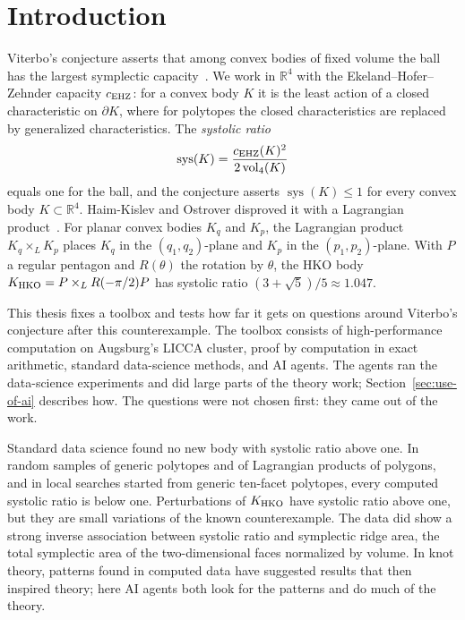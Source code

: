 \section{Introduction}\label{sec:introduction}

Viterbo's conjecture asserts that among convex bodies of fixed volume the
ball has the largest symplectic capacity~\cite{Viterbo2000}. We work in
$\mathbb R^4$ with the Ekeland--Hofer--Zehnder capacity $c_{\rm EHZ}$: for a
convex body $K$ it is the least action of a closed characteristic on
$\partial K$, where for polytopes the closed characteristics are replaced by
generalized characteristics. The \emph{systolic ratio}
\[
 \operatorname{sys}(K)=\frac{c_{\rm EHZ}(K)^2}{2\operatorname{vol}_4(K)}
\]
equals one for the ball, and the conjecture asserts
$\operatorname{sys}(K)\leq1$ for every convex body $K\subset\mathbb R^4$.
Haim-Kislev and Ostrover disproved it with a Lagrangian
product~\cite{HaimKislevOstrover2024}. For planar convex bodies $K_q$ and
$K_p$, the Lagrangian product $K_q\times_L K_p$ places $K_q$ in the
$(q_1,q_2)$-plane and $K_p$ in the $(p_1,p_2)$-plane. With $P$ a regular
pentagon and $R(\theta)$ the rotation by $\theta$, the HKO body
$K_{\rm HKO}=P\times_L R(-\pi/2)P$ has systolic ratio
$(3+\sqrt5)/5\approx1.047$.

This thesis fixes a toolbox and tests how far it gets on questions around
Viterbo's conjecture after this counterexample. The toolbox consists of
high-performance computation on Augsburg's LICCA cluster, proof by
computation in exact arithmetic, standard data-science methods, and AI
agents. The agents ran the data-science experiments and did large parts of
the theory work; Section~\ref{sec:use-of-ai} describes how. The questions
were not chosen first: they came out of the work.

Standard data science found no new body with systolic ratio above one.
In random samples of generic polytopes and of Lagrangian products of
polygons, and in local searches started from generic ten-facet polytopes,
every computed systolic ratio is below one. Perturbations of $K_{\rm HKO}$
have systolic ratio above one, but they are small variations of the known
counterexample. The data did show a strong inverse association between
systolic ratio and symplectic ridge area, the total symplectic area of the
two-dimensional faces normalized by volume. In knot theory, patterns found
in computed data have suggested results that then inspired theory; here AI
agents both look for the patterns and do much of the theory.

